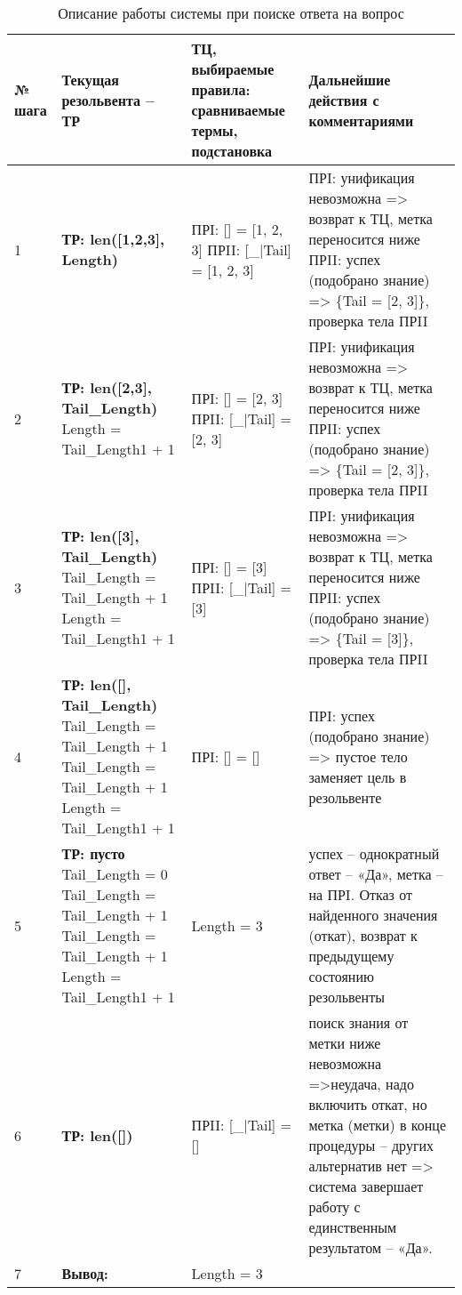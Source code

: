 \begin{table}[h!]
	\caption{Описание работы системы при поиске ответа на вопрос}
	\begin{tabular}{|p{1.2cm}|p{5cm}|p{3cm}|p{7cm}|}
		\hline
		№ шага & Текущая резольвента –  ТР  & ТЦ, выбираемые правила: сравниваемые термы, 
		подстановка
		& Дальнейшие действия с комментариями \\
		\hline
		1 & \textbf{ТР: len([1,2,3], Length)} & ПРI: [] = [1, 2, 3] \newline
		ПРII:	[\_|Tail] = [1, 2, 3] 
		& ПРI: унификация невозможна => возврат к ТЦ, метка переносится ниже \newline ПРII: успех (подобрано знание) => \{Tail = [2, 3]\},  проверка тела ПРII \\
		\hline
		2 & \textbf{ТР: len([2,3], Tail\_Length)} \newline Length = Tail\_Length1 + 1 & ПРI: [] = [2, 3] \newline
		ПРII:	[\_|Tail] = [2, 3]  & ПРI: унификация невозможна => возврат к ТЦ, метка переносится ниже \newline ПРII: успех (подобрано знание) => \{Tail = [2, 3]\},  проверка тела ПРII \\
		\hline
		3 &  \textbf{ТР: len([3], Tail\_Length)} \newline Tail\_Length = Tail\_Length + 1 \newline Length = Tail\_Length1 + 1& ПРI: [] = [3] \newline
		ПРII:	[\_|Tail] = [3]  & ПРI: унификация невозможна => возврат к ТЦ, метка переносится ниже \newline ПРII: успех (подобрано знание) => \{Tail = [3]\},  проверка тела ПРII  \\
		\hline
		4 &  \textbf{ТР: len([], Tail\_Length)} \newline Tail\_Length = Tail\_Length + 1 \newline Tail\_Length = Tail\_Length + 1 \newline Length = Tail\_Length1 + 1 & ПРI: [] = [] & ПРI: успех (подобрано знание) => пустое тело заменяет цель в резольвенте  \\
		\hline
		5 & \textbf{ТР: пусто} \newline Tail\_Length = 0 \newline Tail\_Length = Tail\_Length + 1 \newline Tail\_Length = Tail\_Length + 1 \newline Length = Tail\_Length1 + 1
		 & Length = 3 & успех – однократный ответ – «Да», метка – на ПРI.
		 Отказ от найденного значения (откат), возврат к предыдущему состоянию резольвенты \\
		\hline
		6 & \textbf{ТР: len([])}  & ПРII: [\_|Tail] = []  & поиск знания от метки ниже  невозможна =>неудача, надо включить откат, но 
		метка (метки) в конце процедуры – других альтернатив нет => система завершает работу с единственным результатом – «Да».
		 \\
		\hline
		7 & \textbf{Вывод:} & Length = 3 &  \\
		\hline
	\end{tabular}
	
\end{table}

